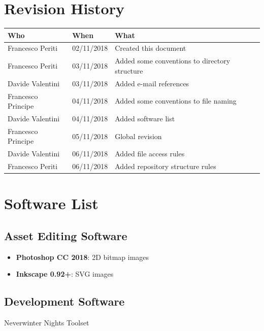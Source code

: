 \documentclass[12pt]{article}
\begin{document}
\clearpage

\section*{Revision History}
\begin{table}[H]
\centering
\begin{tabular}{|l|l|l|}
\hline
\cellcolor{lightgray}\textbf{Who} & \cellcolor{lightgray}\textbf{When} & \cellcolor{lightgray}\textbf{What} \\ \hline
Francesco Periti & 02/11/2018 & Created this document \\ \hline
Francesco Periti & 03/11/2018 & Added some conventions to directory structure \\ \hline
Davide Valentini & 03/11/2018 & Added e-mail references \\ \hline
Francesco Principe & 04/11/2018 & Added some conventions to file naming \\ \hline
Davide Valentini & 04/11/2018 & Added software list \\ \hline
Francesco Principe & 05/11/2018 & Global revision \\ \hline
Davide Valentini & 06/11/2018 & Added file access rules \\ \hline
Francesco Periti & 06/11/2018 & Added repository structure rules \\ \hline
\end{tabular}
\end{table}

\clearpage

\section{Software List}

\subsection{Asset Editing Software}
\begin{itemize}
	\item \textbf{Photoshop CC 2018}: 2D bitmap images
	\item \textbf{Inkscape 0.92+}: SVG images
\end{itemize}

\subsection{Development Software}
Neverwinter Nights Toolset
\end{document}
